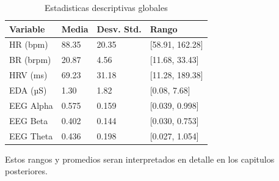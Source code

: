 \begin{table}[H]
\centering
\caption{Estadisticas descriptivas globales}
\begin{tabular}{|l|l|l|l|}
\hline
\textbf{Variable} & \textbf{Media} & \textbf{Desv. Std.} & \textbf{Rango} \\
\hline
HR (bpm) & 88.35 & 20.35 & [58.91, 162.28] \\
BR (brpm) & 20.87 & 4.56 & [11.68, 33.43] \\
HRV (ms) & 69.23 & 31.18 & [11.28, 189.38] \\
EDA (µS) & 1.30 & 1.82 & [0.08, 7.68] \\
EEG Alpha & 0.575 & 0.159 & [0.039, 0.998] \\
EEG Beta & 0.402 & 0.144 & [0.030, 0.753] \\
EEG Theta & 0.436 & 0.198 & [0.027, 1.054] \\
\hline
\end{tabular}
\end{table}

Estos rangos y promedios seran interpretados en detalle en los capitulos posteriores.
